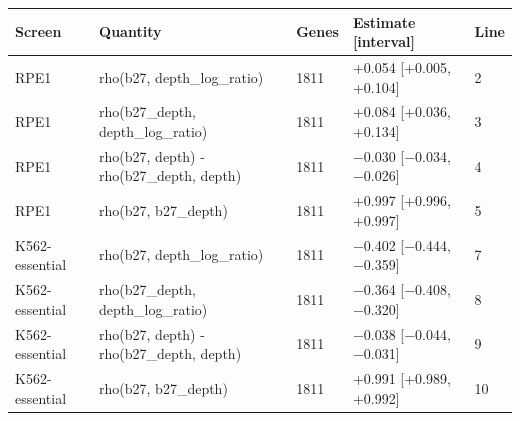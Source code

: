 \begin{tabular}{lllll}
\toprule
Screen & Quantity & Genes & Estimate [interval] & Line \\
\midrule
RPE1 & rho(b27, depth\_log\_ratio) & 1811 & +0.054 [+0.005, +0.104] & 2 \\
RPE1 & rho(b27\_depth, depth\_log\_ratio) & 1811 & +0.084 [+0.036, +0.134] & 3 \\
RPE1 & rho(b27, depth) - rho(b27\_depth, depth) & 1811 & −0.030 [−0.034, −0.026] & 4 \\
RPE1 & rho(b27, b27\_depth) & 1811 & +0.997 [+0.996, +0.997] & 5 \\
K562-essential & rho(b27, depth\_log\_ratio) & 1811 & −0.402 [−0.444, −0.359] & 7 \\
K562-essential & rho(b27\_depth, depth\_log\_ratio) & 1811 & −0.364 [−0.408, −0.320] & 8 \\
K562-essential & rho(b27, depth) - rho(b27\_depth, depth) & 1811 & −0.038 [−0.044, −0.031] & 9 \\
K562-essential & rho(b27, b27\_depth) & 1811 & +0.991 [+0.989, +0.992] & 10 \\
\bottomrule
\end{tabular}
